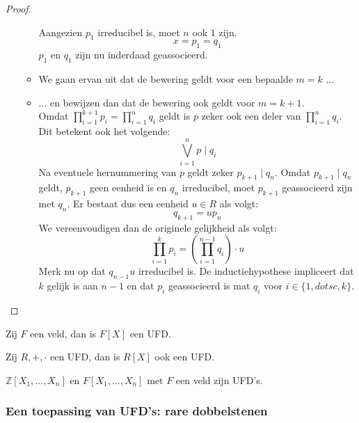 \documentclass[main.tex]{subfiles}
\begin{document}
\begin{st}
\begin{proof}
\begin{itemize}
\begin{itemize}
        Aangezien $p_{1}$ irreducibel is, moet $n$ ook $1$ zijn.
        \[ x = p_{1} = q_{1} \]
        $p_{1}$ en $q_{1}$ zijn nu inderdaad geassocieerd.
      \item We gaan ervan uit dat de bewering geldt voor een bepaalde $m=k$ ...
      \item ... en bewijzen dan dat de bewering ook geldt voor $m=k+1$.\\
        Omdat $ \prod_{i=1}^{k+1}p_{i} = \prod_{i=1}^{n}q_{i}$ geldt is $p$ zeker ook een deler van $\prod_{i=1}^{n}q_{i}$.
        Dit betekent ook het volgende:
        \[ \bigvee_{i=1}^{n}p \mid q_{i}\]
        Na eventuele hernummering van $p$ geldt zeker $p_{k+1} \mid q_{n}$.
        Omdat $p_{k+1} \mid q_{n}$ geldt, $p_{k+1}$ geen eenheid is en $q_{n}$ irreducibel, moet $p_{k+1}$ geassocieerd zijn met $q_{n}$.
        Er bestaat dus een eenheid $u\in R$ als volgt:
        \[ q_{k+1} = up_{n}\]
        We vereenvoudigen dan de originele gelijkheid als volgt:
        \[ \prod_{i=1}^{k}p_{i} = \left(\prod_{i=1}^{n-1}q_{i}\right) \cdot u\]
        Merk nu op dat $q_{n-1}u$ irreducibel is.\waarom
        De inductiehypothese impliceert dat $k$ gelijk is aan $n-1$ en dat $p_{i}$ geassocieerd is mat $q_{i}$ voor $i \in \{ 1,dotsc,k\}$.
      \end{itemize}
    \end{itemize}
  \end{proof}
\end{st}

\begin{gev}
  \label{gev:veeltermen-over-veld-ufd}
  Zij $F$ een veld, dan is $F[X]$ een UFD.
\end{gev}

\begin{st}
  Zij $R,+,\cdot$ een UFD, dan is $R[X]$ ook een UFD.
  \zb
\end{st}

\begin{gev}
  $\mathbb{Z}[X_{1},\dotsc,X_{n}]$ en $F[X_{1},\dotsc,X_{n}]$ met $F$ een veld zijn UFD's.
\end{gev}

\subsubsection{Een toepassing van UFD's: rare dobbelstenen}
\label{sec:een-toepassing-van-ufds}
\end{document}
